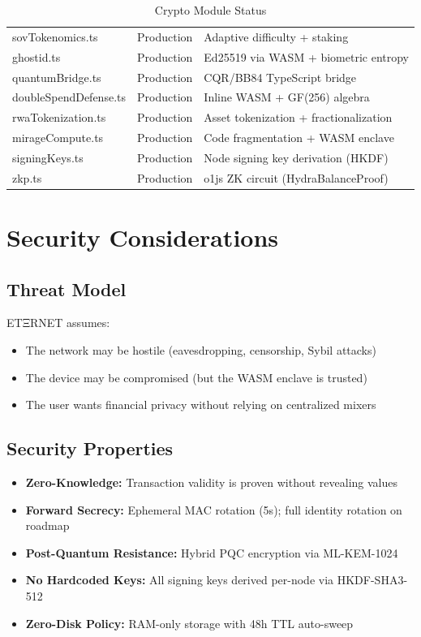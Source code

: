 \documentclass[11pt,a4paper]{article}
\begin{document}
\begin{table}[h]
\begin{tabular}{@{}lll@{}}
sovTokenomics.ts & Production & Adaptive difficulty + staking \\
ghostid.ts & Production & Ed25519 via WASM + biometric entropy \\
quantumBridge.ts & Production & CQR/BB84 TypeScript bridge \\
doubleSpendDefense.ts & Production & Inline WASM + GF(256) algebra \\
rwaTokenization.ts & Production & Asset tokenization + fractionalization \\
mirageCompute.ts & Production & Code fragmentation + WASM enclave \\
signingKeys.ts & Production & Node signing key derivation (HKDF) \\
zkp.ts & Production & o1js ZK circuit (HydraBalanceProof) \\
\bottomrule
\end{tabular}
\caption{Crypto Module Status}
\end{table}

\section{Security Considerations}

\subsection{Threat Model}
ETΞRNET assumes:
\begin{itemize}[nosep]
  \item The network may be hostile (eavesdropping, censorship, Sybil attacks)
  \item The device may be compromised (but the WASM enclave is trusted)
  \item The user wants financial privacy without relying on centralized mixers
\end{itemize}

\subsection{Security Properties}
\begin{itemize}[nosep]
  \item \textbf{Zero-Knowledge:} Transaction validity is proven without revealing values
  \item \textbf{Forward Secrecy:} Ephemeral MAC rotation (5s); full identity rotation on roadmap
  \item \textbf{Post-Quantum Resistance:} Hybrid PQC encryption via ML-KEM-1024
  \item \textbf{No Hardcoded Keys:} All signing keys derived per-node via HKDF-SHA3-512
  \item \textbf{Zero-Disk Policy:} RAM-only storage with 48h TTL auto-sweep
\end{itemize}
\end{document}
